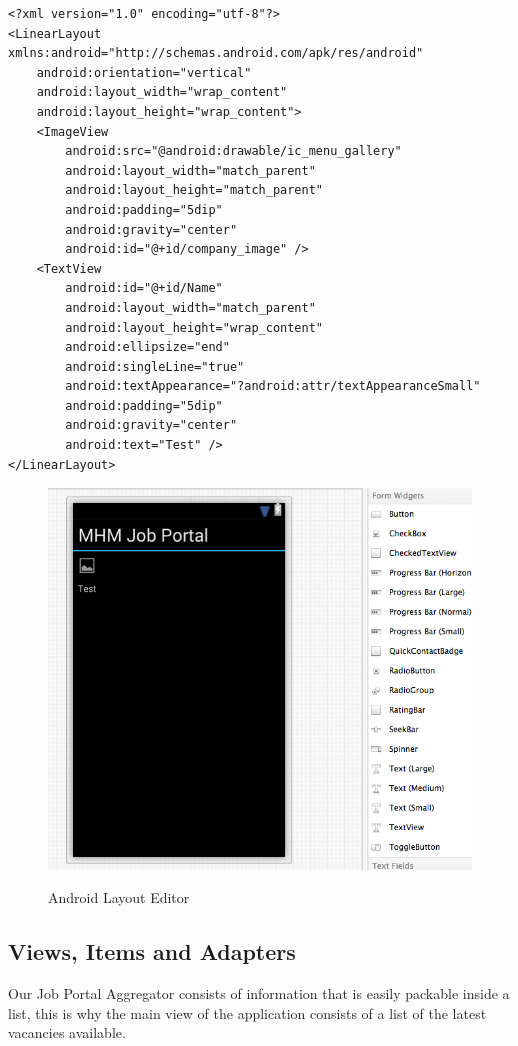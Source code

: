 \lstset{language=XML}
\begin{lstlisting}[frame=lt,caption=Company.axml, label={list:and_xml}]
<?xml version="1.0" encoding="utf-8"?>
<LinearLayout xmlns:android="http://schemas.android.com/apk/res/android"
    android:orientation="vertical"
    android:layout_width="wrap_content"
    android:layout_height="wrap_content">
    <ImageView
        android:src="@android:drawable/ic_menu_gallery"
        android:layout_width="match_parent"
        android:layout_height="match_parent"
        android:padding="5dip"
        android:gravity="center"
        android:id="@+id/company_image" />
    <TextView
        android:id="@+id/Name"
        android:layout_width="match_parent"
        android:layout_height="wrap_content"
        android:ellipsize="end"
        android:singleLine="true"
        android:textAppearance="?android:attr/textAppearanceSmall"
        android:padding="5dip"
        android:gravity="center"
        android:text="Test" />
</LinearLayout>
\end{lstlisting}


\begin{figure}[H]
    \begin{center}
        {\includegraphics[width=0.75\linewidth]{gfx/and_view}}
        \caption[Android Layout Editor]{Android Layout Editor}\label{fig:and_layout}
    \end{center}
\end{figure}

\subsection{Views, Items and Adapters}
Our Job Portal Aggregator consists of information that is easily packable inside a list, this is why the main view of the application consists of a list of the latest vacancies available.

